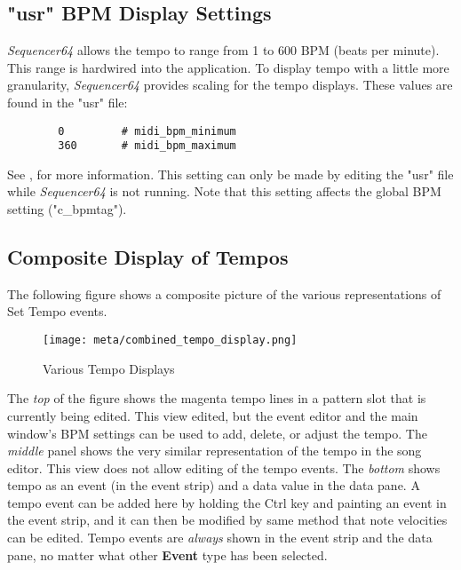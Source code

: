 \subsection{"usr" BPM Display Settings}
\label{subsec:meta_events_usr}

   \textsl{Sequencer64} allows the tempo to range from 1 to 600 BPM
   (beats per minute).
   This range is hardwired into the application.
   To display tempo with a little more granularity,
   \textsl{Sequencer64} provides scaling for the tempo
   displays.  These values are found in the "usr" file:

   \begin{verbatim}
		0         # midi_bpm_minimum
		360       # midi_bpm_maximum
   \end{verbatim}

   See , for more
   information.  This setting can only be made by editing the "usr" file
   while \textsl{Sequencer64} is not running.
   Note that this setting affects the global BPM setting ("c\_bpmtag").


\subsection{Composite Display of Tempos}
\label{subsec:meta_events_composite_display}

The following figure shows a composite picture of the various representations
of Set Tempo events.

\begin{figure}[H]
   \centering 
   \texttt{[image: meta/combined\_tempo\_display.png]}
   \caption{Various Tempo Displays}
   \label{fig:meta_events_tempo_displays}
\end{figure}

The \textsl{top} of the figure shows the magenta tempo lines in a pattern slot
that is currently being edited.  This view edited, but the
event editor and the main window's BPM settings can be used to add, delete, or
adjust the tempo.
The \textsl{middle} panel shows the very similar representation of the tempo in
the song editor.  This view does not allow editing of the tempo events.
The \textsl{bottom} shows tempo as an event (in the event strip) and a data
value in the data pane.  A tempo event can be added here by holding the Ctrl
key and painting an event in the event strip, and it can then be modified by
same method that note velocities can be edited.  Tempo events are
\textsl{always} shown in the event strip and the data pane, no matter what
other \textbf{Event} type has been selected.

